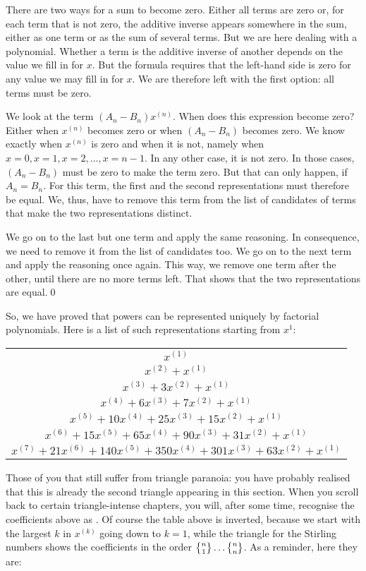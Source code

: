 \documentclass[tikz]{scrreprt}
\begin{document}
There are two ways for a sum to become zero.
Either all terms are zero or, for each term
that is not zero, the additive inverse
appears somewhere in the sum, either as
one term or as the sum of several terms.
But we are here dealing with a polynomial.
Whether a term is the additive inverse of another
depends on the value we fill in for $x$.
But the formula requires that the left-hand side
is zero for any value we may fill in for $x$.
We are therefore left with the first option:
all terms must be zero.

We look at the term $(A_n-B_n)x^{(n)}$.
When does this expression become zero?
Either when $x^{(n)}$ becomes zero or 
when $(A_n-B_n)$ becomes zero.
We know exactly when $x^{(n)}$ is zero
and when it is not, namely when
$x=0, x=1, x=2, \dots, x=n-1$.
In any other case, it is not zero.
In those cases, $(A_n-B_n)$ must be zero
to make the term zero. But that can only happen,
if $A_n = B_n$.
For this term, the first and the second
representations must therefore be equal.
We, thus, have to remove this term from
the list of candidates of terms
that make the two representations distinct.

We go on to the last but one term and
apply the same reasoning.
In consequence, we need to remove it
from the list of candidates too.
We go on to the next term and apply
the reasoning once again.
This way, we remove one term after the other,
until there are no more terms left.
That shows that the two representations are equal.\qed

So, we have proved that powers can be represented
uniquely by factorial polynomials. Here is a list
of such representations starting from $x^1$:

\begin{center}
\begin{tabular}{c}
$x^{(1)}$ \\
$x^{(2)} + x^{(1)}$ \\
$x^{(3)} + 3x^{(2)} + x^{(1)}$\\
$x^{(4)} + 6x^{(3)} + 7x^{(2)} + x^{(1)}$\\
$x^{(5)} + 10x^{(4)} + 25x^{(3)} +15x^{(2)} + x^{(1)}$ \\
$x^{(6)} + 15x^{(5)} + 65x^{(4)} + 90x^{(3)} + 31x^{(2)} + x^{(1)}$ \\
$x^{(7)} + 21x^{(6)} + 140x^{(5)} + 350x^{(4)} + 301x^{(3)} + 63x^{(2)} + x^{(1)}$  
\end{tabular}
\end{center}

Those of you that still suffer from triangle paranoia:
you have probably realised that this is already the second
triangle appearing in this section.
When you scroll back to certain triangle-intense chapters,
you will, after some time, recognise the coefficients above as 
.
Of course the table above is inverted, because we start
with the largest $k$ in $x^{(k)}$ going down to $k=1$,
while the triangle for the Stirling numbers shows
the coefficients in the order 
$\stirlingTwo{n}{1} \dots \stirlingTwo{n}{n}$.
As a reminder, here they are:
\end{document}
